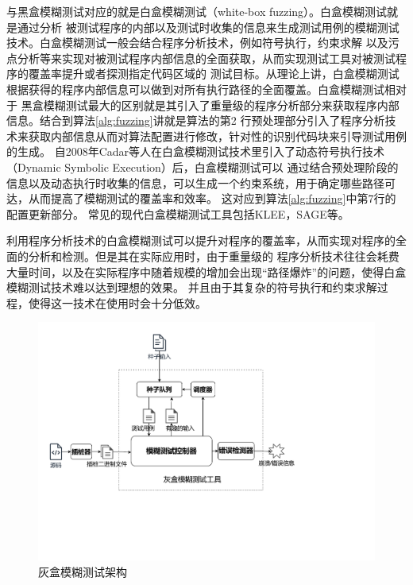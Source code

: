 \documentclass[bachelor]{njupthesis}
\begin{document}
与黑盒模糊测试对应的就是白盒模糊测试\cite{godefroid2008automated}（white-box fuzzing）。白盒模糊测试就是通过分析
被测试程序的内部以及测试时收集的信息来生成测试用例的模糊测试技术。白盒模糊测试一般会结合程序分析技术，例如符号执行，约束求解
以及污点分析等来实现对被测试程序内部信息的全面获取，从而实现测试工具对被测试程序的覆盖率提升或者探测指定代码区域的
测试目标。从理论上讲，白盒模糊测试根据获得的程序内部信息可以做到对所有执行路径的全面覆盖。白盒模糊测试相对于
黑盒模糊测试最大的区别就是其引入了重量级的程序分析部分来获取程序内部信息。结合到算法\ref{alg:fuzzing}讲就是算法的第2
行预处理部分引入了程序分析技术来获取内部信息从而对算法配置进行修改，针对性的识别代码块来引导测试用例的生成\cite{godefroid2008automated}。
自2008年Cadar等人在白盒模糊测试技术里引入了动态符号执行技术（Dynamic Symbolic Execution）\cite{cadar2008klee}后，白盒模糊测试可以
通过结合预处理阶段的信息以及动态执行时收集的信息，可以生成一个约束系统，用于确定哪些路径可达，从而提高了模糊测试的覆盖率和效率。
这对应到算法\ref{alg:fuzzing}中第7行的配置更新部分。
常见的现代白盒模糊测试工具包括KLEE\cite{cadar2008klee}，SAGE\cite{sage}等。

利用程序分析技术的白盒模糊测试可以提升对程序的覆盖率，从而实现对程序的全面的分析和检测。但是其在实际应用时，由于重量级的
程序分析技术往往会耗费大量时间，以及在实际程序中随着规模的增加会出现“路径爆炸”的问题，使得白盒模糊测试技术难以达到理想的效果。
并且由于其复杂的符号执行和约束求解过程，使得这一技术在使用时会十分低效。

\begin{figure}[htbp]
	\centering
	\includegraphics[width=1\textwidth]{pic/GF.pdf}
	\caption{灰盒模糊测试架构}
 	\label{GF}
\end{figure}
\end{document}
